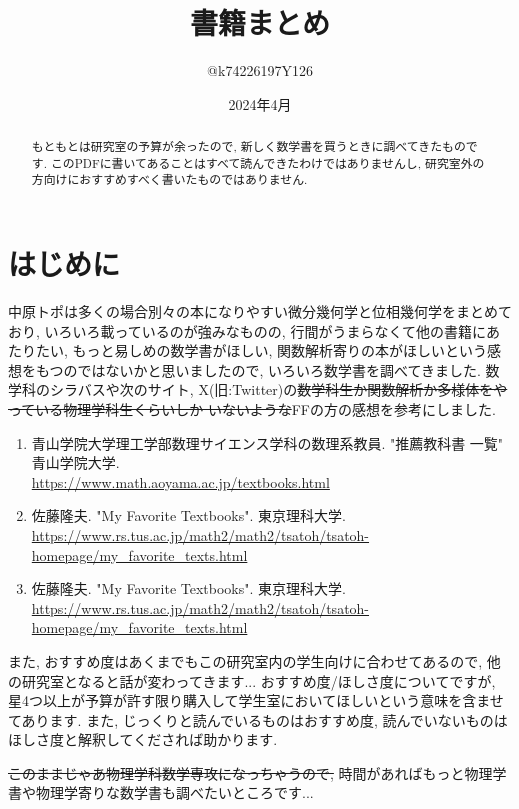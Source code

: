 \documentclass[10pt,a4paper]{jsarticle}
\title{書籍まとめ}
\author{@k74226197Y126}
\date{2024年4月}
\begin{document}
\maketitle
\begin{abstract}
    もともとは研究室の予算が余ったので, 新しく数学書を買うときに調べてきたものです. このPDFに書いてあることはすべて読んできたわけではありませんし, 研究室外の方向けにおすすめすべく書いたものではありません. 
\end{abstract}
\tableofcontents
\clearpage
\section{はじめに}
    中原トポは多くの場合別々の本になりやすい微分幾何学と位相幾何学をまとめており, いろいろ載っているのが強みなものの, 行間がうまらなくて他の書籍にあたりたい, もっと易しめの数学書がほしい, 関数解析寄りの本がほしいという感想をもつのではないかと思いましたので, いろいろ数学書を調べてきました. 数学科のシラバスや次のサイト, X(旧:Twitter)の\sout{数学科生か関数解析か多様体をやっている物理学科生くらいしか いないような}FFの方の感想を参考にしました. 
    \begin{enumerate}
        \renewcommand{\theenumi}{\arabic{enumi}}
        \renewcommand{\labelenumi}{[\theenumi]}
        \setcounter{enumi}{0}
        \item 青山学院大学理工学部数理サイエンス学科の数理系教員. "推薦教科書 一覧" 青山学院大学. \\
        \url{https://www.math.aoyama.ac.jp/textbooks.html} 
        \item 佐藤隆夫. "My Favorite Textbooks". 東京理科大学. \\
        \url{https://www.rs.tus.ac.jp/math2/math2/tsatoh/tsatoh-homepage/my_favorite_texts.html} 
        \item 佐藤隆夫. "My Favorite Textbooks". 東京理科大学. \\
        \url{https://www.rs.tus.ac.jp/math2/math2/tsatoh/tsatoh-homepage/my_favorite_texts.html} 
    \end{enumerate}\par
    また, おすすめ度はあくまでもこの研究室内の学生向けに合わせてあるので, 他の研究室となると話が変わってきます... おすすめ度/ほしさ度についてですが, 星4つ以上が予算が許す限り購入して学生室においてほしいという意味を含ませてあります. また, じっくりと読んでいるものはおすすめ度, 読んでいないものはほしさ度と解釈してくだされば助かります. \par
    \sout{このままじゃあ物理学科数学専攻になっちゃうので, }時間があればもっと物理学書や物理学寄りな数学書も調べたいところです...
\end{document}
